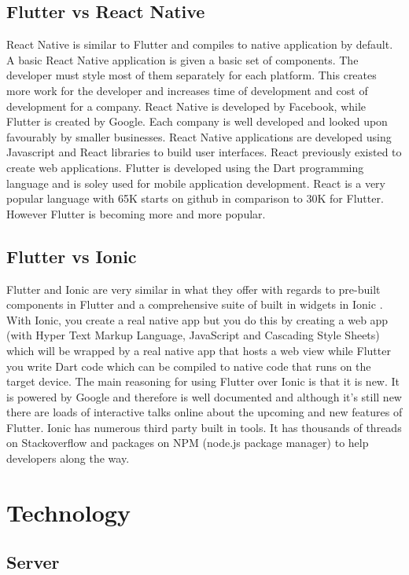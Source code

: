 \subsection{Flutter vs React Native}
React Native is similar to Flutter and compiles to native application by default. A basic React Native application is given a basic set of components. The developer must style most of them separately for each platform. This creates more work for the developer and increases time of development and cost of development for a company. React Native is developed by Facebook, while Flutter is created by Google. Each company is well developed and looked upon favourably by smaller businesses. React Native applications are developed using Javascript and React libraries to build user interfaces. React previously existed to create web applications. Flutter is developed using the Dart programming language and is soley used for mobile application development. React is a very popular language with 65K starts on github in comparison to 30K for Flutter. However Flutter is becoming more and more popular. \cite{FlutterVS_2018} \cite{ReactVsFlutterVsIonic}

\subsection{Flutter vs Ionic}
Flutter and Ionic are very similar in what they offer with regards to pre-built components in Flutter and a comprehensive suite of built in widgets in Ionic \cite{ReactVsFlutterVsIonic}. With Ionic, you create a real native app but you do this by creating a web app (with Hyper Text Markup Language, JavaScript and Cascading Style Sheets) which will be wrapped by a real native app that hosts a web view while Flutter you write Dart code which can be compiled to native code that runs on the target device. The main reasoning for using Flutter over Ionic is that it is new. It is powered by Google and therefore is well documented and although it’s still new there are loads of interactive talks online about the upcoming and new features of Flutter. Ionic has numerous third party built in tools. It has thousands of threads on Stackoverflow and packages on NPM (node.js package manager) to help developers along the way.\cite{FlutterVS_2018}

\section{Technology}
\subsection{Server}
